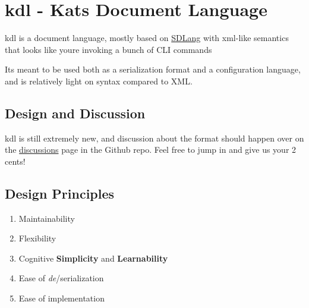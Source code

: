 \hypertarget{kdl---kats-document-language}{%
\section{kdl - Kat\textquotesingle s Document
Language}\label{kdl---kats-document-language}}

\leavevmode{}%
kdl is a document language, mostly based on
\href{https://sdlang.org}{SDLang} with xml-like semantics that looks
like you\textquotesingle re invoking a bunch of CLI commands

It\textquotesingle s meant to be used both as a serialization format and
a configuration language, and is relatively light on syntax compared to
XML.

\hypertarget{design-and-discussion}{%
\subsection{Design and Discussion}\label{design-and-discussion}}

kdl is still extremely new, and discussion about the format should
happen over on the
\href{https://github.com/kdoclang/kdl/discussions}{discussions} page in
the Github repo. Feel free to jump in and give us your 2 cents!

\hypertarget{design-principles}{%
\subsection{Design Principles}\label{design-principles}}

\begin{enumerate}
\tightlist
\item
  Maintainability
\item
  Flexibility
\item
  Cognitive \textbf{Simplicity} and \textbf{Learnability}
\item
  Ease of \emph{de}/serialization
\item
  Ease of implementation
\end{enumerate}
